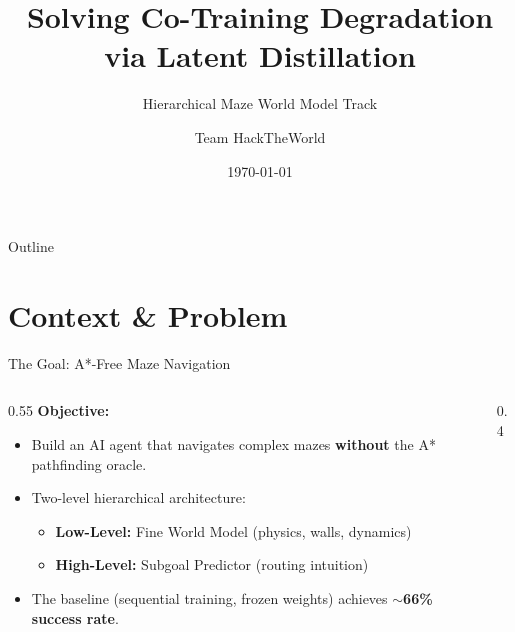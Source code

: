 \documentclass{beamer}
\title[Latent Distillation]{\textbf{Solving Co-Training Degradation\\via Latent Distillation}}
\subtitle{Hierarchical Maze World Model Track}
\author{Team HackTheWorld}
\institute{VivaTech Hackathon 2026}
\date{\today}
\begin{document}
\begin{frame}
    \titlepage
\end{frame}

\begin{frame}{Outline}
    \tableofcontents
\end{frame}

\section{Context \& Problem}

\begin{frame}{The Goal: A*-Free Maze Navigation}
    \begin{columns}[T]
        \begin{column}{0.55\textwidth}
            \textbf{Objective:}
            \begin{itemize}
                \item Build an AI agent that navigates complex mazes \textbf{without} the A* pathfinding oracle.
                \item Two-level hierarchical architecture:
                \begin{itemize}
                    \item[\textcolor{deepblue}{$\blacktriangleright$}] \textbf{Low-Level:} Fine World Model (physics, walls, dynamics)
                    \item[\textcolor{accent}{$\blacktriangleright$}] \textbf{High-Level:} Subgoal Predictor (routing intuition)
                \end{itemize}
                \item The baseline (sequential training, frozen weights) achieves \textbf{$\sim$66\% success rate}.
            \end{itemize}
        \end{column}
        \begin{column}{0.4\textwidth}
            \begin{center}
\end{center}
\end{column}
\end{columns}
\end{frame}
\end{document}
